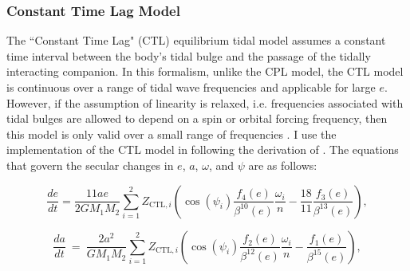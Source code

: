 \subsubsection{Constant Time Lag Model}

The ``Constant Time Lag" (CTL) \citep[][]{Hut1981,Leconte2010} equilibrium tidal model assumes a constant time interval between the body's tidal bulge and the passage of the tidally interacting companion. In this formalism, unlike the CPL model, the CTL model is continuous over a range of tidal wave frequencies and applicable for large $e$.  However, if the assumption of linearity is relaxed, i.e. frequencies associated with tidal bulges are allowed to depend on a spin or orbital forcing frequency, then this model is only valid over a small range of frequencies \citep{Greenberg2009}. I use the \eqtide implementation of the CTL model in \vplanet following the derivation of \citet{Leconte2010}.  The equations that govern the secular changes in $e$, $a$, $\omega$, and $\psi$ are as follows:

\begin{equation} \label{sync:eqn:ctl:e}
  \frac{de}{dt} = \frac{11 ae}{2 G M_1 M_2}
  \sum_{i = 1}^2 Z_{\mathrm{CTL},i} \left( \cos(\psi_i) \frac{f_4(e)}{\beta^{10}(e)}  \frac{\omega_i}{n} -\frac{18}{11} \frac{f_3(e)}{\beta^{13}(e)}\right),
\end{equation}

\small
\begin{equation}\label{sync:eqn:ctl:a}
  \frac{da}{dt} \ = \  \frac{2 a^2}{G M_1 M_2}
  \sum\limits_{i = 1}^2 Z_{\mathrm{CTL},i} \left( \cos(\psi_i) \frac{f_2(e)}{\beta^{12}(e)} \frac{\omega_i}{n} - \frac{f_1(e)}{\beta^{15}(e)}\right),
\end{equation}

